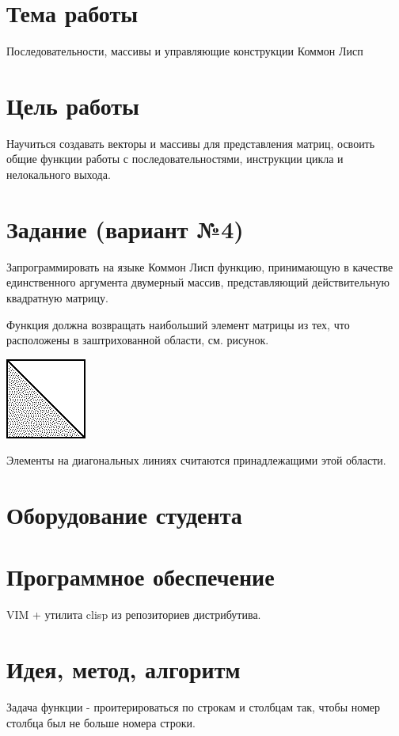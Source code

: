 \documentclass[12pt]{article}
\begin{document}

\section{Тема работы}
Последовательности, массивы и управляющие конструкции Коммон Лисп

\section{Цель работы}
Научиться создавать векторы и массивы для представления матриц,
освоить общие функции работы с последовательностями,
инструкции цикла и нелокального выхода.

\section{Задание (вариант №4)}
Запрограммировать на языке Коммон Лисп функцию, принимающую в качестве
единственного аргумента двумерный массив,
представляющий действительную квадратную матрицу.

Функция должна возвращать наибольший элемент матрицы из тех,
что расположены в заштрихованной области, см. рисунок.

\includegraphics{arrays_matrix-bl.png}

Элементы на диагональных линиях считаются принадлежащими этой области.

\section{Оборудование студента}
\mypc

\section{Программное обеспечение}
VIM + утилита clisp из репозиториев дистрибутива.

\section{Идея, метод, алгоритм}

Задача функции - проитерироваться по строкам и столбцам так, чтобы номер столбца был не больше
номера строки.
\end{document}

